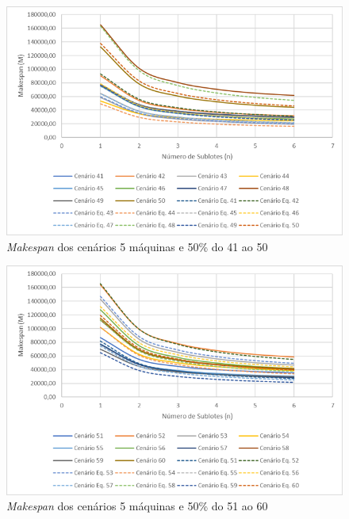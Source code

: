 \begin{figure}[H]
    \centering
    \includegraphics[width=13cm]{Apendices/Figuras/05m50_41-50}
    \caption{\textit{Makespan} dos cenários 5 máquinas e 50\% do 41 ao 50}
    \label{fig:05m50_41-50}
\end{figure}

\begin{figure}[H]
    \centering
    \includegraphics[width=13cm]{Apendices/Figuras/05m50_51-60}
    \caption{\textit{Makespan} dos cenários 5 máquinas e 50\% do 51 ao 60}
    \label{fig:05m50_51-60}
\end{figure}

